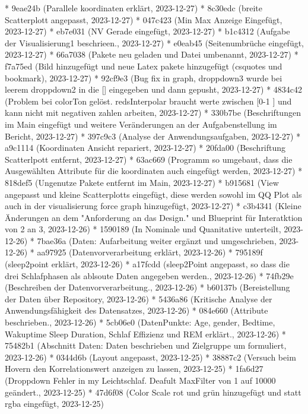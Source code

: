 \documentclass[usegeometry=true]{scrartcl}
\begin{document}
* 9eae24b (Parallele koordinaten erklärt, 2023-12-27)
* 8c30edc (breite Scatterplott angepasst, 2023-12-27)
* 047c423 (Min Max Anzeige Eingefügt, 2023-12-27)
* eb7e031 (NV Gerade eingefügt, 2023-12-27)
* b1c4312 (Aufgabe der Visualisierung1 beschrieen., 2023-12-27)
* e0eab45 (Seitenumbrüche eingefügt, 2023-12-27)
* 66a7038 (Pakete neu geladen und Datei umbenannt, 2023-12-27)
* f7a75ed (Bild hinzugefügt und neue Latex pakete hinzugefügt (csquotes und bookmark), 2023-12-27)
* 92cf9e3 (Bug fix in graph, droppdown3 wurde bei leerem droppdown2 in die [] eingegeben und dann gepusht, 2023-12-27)
* 4834c42 (Problem bei colorTon gelöst. redsInterpolar braucht werte zwischen [0-1 ] und kann nicht mit negativen zahlen arbeiten, 2023-12-27)
* 330b7be (Beschriftungen im Main eingefügt und weitere Veränderungen an der Aufgabenstellung im Bericht, 2023-12-27)
* 397c9c3 (Analyse der Anwendungsaufgaben, 2023-12-27)
* a9c1114 (Koordinaten Ansicht repariert, 2023-12-27)
* 20fda00 (Beschriftung Scatterlpott entfernt, 2023-12-27)
* 63ac669 (Programm so umgebaut, dass die Ausgewählten Attribute für die koordinaten auch eingefügt werden, 2023-12-27)
* 818def5 (Ungenutze Pakete entfernt im Main, 2023-12-27)
* b915681 (View angepasst und kleine Scatterplotts eingefügt, diese werden sowohl im QQ Plot als auch in der visualisierung force graph hinzugefügt, 2023-12-27)
* c3b4341 (Kleine Änderungen an dem "Anforderung an das Design." und Blueprint für Interatktion von 2 an 3, 2023-12-26)
* 1590189 (In Nominale und Quanitative unterteilt, 2023-12-26)
* 7bae36a (Daten: Aufarbeitung weiter ergänzt und umgeschrieben, 2023-12-26)
* aa97925 (Datenvorverarbeitung erklärt, 2023-12-26)
* 795189f (sleep2point erklärt, 2023-12-26)
* a17fcdd (sleep2Point angepasst, so dass die drei Schlafphasen als ablsoute Daten angegeben werden., 2023-12-26)
* 74fb29e (Beschreiben der Datenvorverarbeitung., 2023-12-26)
* b60137b (Bereistellung der Daten über Repository, 2023-12-26)
* 5436a86 (Kritische Analyse der Anwendungsfähigkeit des Datensatzes, 2023-12-26)
* 084e660 (Attribute beschrieben., 2023-12-26)
* 5cb06e0 (DatenPunkte: Age, gender, Bedtime, Wakuptime Sleep Duration, Schlaf Effizienz und REM erklärt., 2023-12-26)
* 75482b1 (Abschnitt Daten: Daten beschrieben und Zielgruppe um formuliert, 2023-12-26)
* 0344d6b (Layout angepasst, 2023-12-25)
* 38887c2 (Versuch beim Hovern den Korrelationswert anzeigen zu lassen, 2023-12-25)
* 1fa6d27 (Droppdown Fehler in my Leichtschlaf. Deafult MaxFilter von 1 auf 10000 geändert., 2023-12-25)
* 47d6f08 (Color Scale rot und grün hinzugefügt und statt rgba eingefügt, 2023-12-25)
\end{document}
